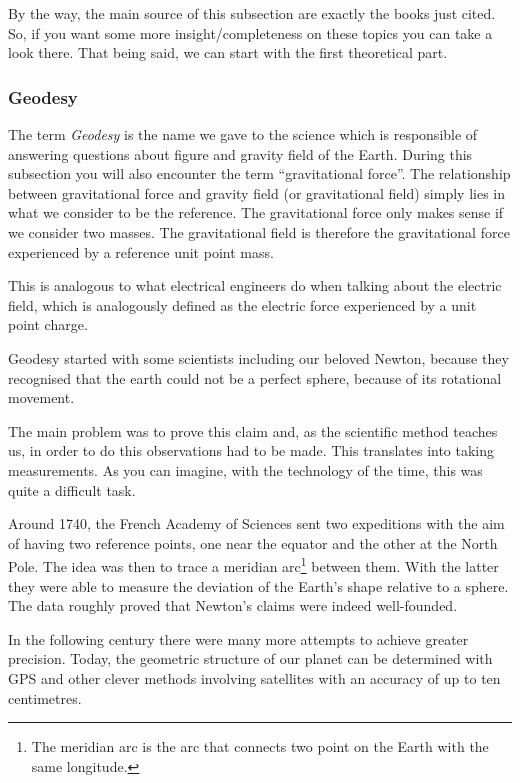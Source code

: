 By the way, the main source of this subsection are exactly the books just cited. So, if you want some more 
insight/completeness on these topics you can take a look there. That being said, we can start with the first theoretical part.

\subsubsection{Geodesy}
The term \emph{Geodesy} is the name we gave to the science which is responsible 
of answering questions about figure and gravity field of the Earth. During this subsection you will also encounter the term
``gravitational force''. The relationship between gravitational force and gravity field (or gravitational field) simply lies 
in what we consider to be the reference. The gravitational force only makes sense if we consider two masses. 
The gravitational field is therefore the gravitational force experienced by a reference unit point mass. 

This is analogous to what electrical engineers do when talking about the electric field, which is analogously defined 
as the electric force experienced by a unit point charge.

Geodesy started with some scientists including our beloved Newton, because they recognised that the earth could not be a perfect sphere, 
because of its rotational movement. 

The main problem was to prove this claim and, as the scientific method teaches us, in order to do this observations had to be made.
This translates into taking measurements. As you can imagine, with the technology of the time, this was quite a difficult task. 

Around 1740, the French Academy of Sciences sent two expeditions with the aim of having two reference points, one near the equator and the other 
at the North Pole. The idea was then to trace a meridian arc\footnote{ The meridian arc is the arc that connects two point on the Earth with 
the same longitude. } between them. With the latter they were able to measure the deviation of the 
Earth's shape relative to a sphere. The data roughly proved that Newton's claims were indeed well-founded.

In the following century there were many more attempts to achieve greater precision. Today, the geometric structure of our planet can be 
determined with GPS and other clever methods involving satellites with an accuracy of up to ten centimetres. 

